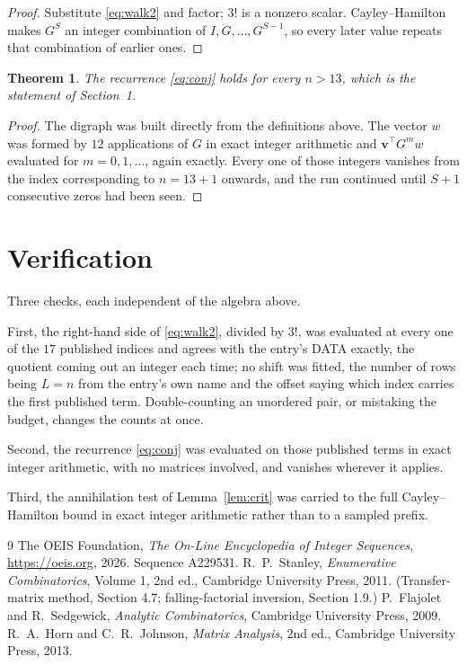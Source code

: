 \documentclass[11pt,a4paper]{article}
\theoremstyle{plain}
\newtheorem{theorem}{Theorem}
\theoremstyle{definition}
\begin{document}
\begin{proof}
Substitute \eqref{eq:walk2} and factor; $3!$ is a nonzero scalar. Cayley--Hamilton
makes $G^{S}$ an integer combination of $I,G,\dots,G^{S-1}$, so every later value repeats
that combination of earlier ones.
\end{proof}

\begin{theorem}
The recurrence \eqref{eq:conj} holds for every $n>13$, which is the statement of
Section~1.
\end{theorem}

\begin{proof}
The digraph was built directly from the definitions above. The vector $w$ was formed by
$12$ applications of $G$ in exact integer arithmetic and $\mathbf{v}^{\!\top}G^{m}w$
evaluated for $m=0,1,\dots$, again exactly. Every one of those integers vanishes from the
index corresponding to $n=13+1$ onwards, and the run continued until $S+1$ consecutive
zeros had been seen.
\end{proof}

\section{Verification}

Three checks, each independent of the algebra above.

First, the right-hand side of \eqref{eq:walk2}, divided by $3!$, was evaluated at every
one of the $17$ published indices and agrees with the entry's DATA exactly, the quotient
coming out an integer each time; no shift was fitted, the number of rows being $L=n$
from the entry's own name and the offset saying which index carries the first published term.
Double-counting an unordered pair, or mistaking the budget, changes the counts at once.

Second, the recurrence \eqref{eq:conj} was evaluated on those published terms in exact
integer arithmetic, with no matrices involved, and vanishes wherever it applies.

Third, the annihilation test of Lemma~\ref{lem:crit} was carried to the full
Cayley--Hamilton bound in exact integer arithmetic rather than to a sampled prefix.

\begin{thebibliography}{9}
 The OEIS Foundation, \emph{The On-Line Encyclopedia of Integer
Sequences}, \url{https://oeis.org}, 2026. Sequence A229531.
 R.~P.~Stanley, \emph{Enumerative Combinatorics}, Volume 1, 2nd ed.,
Cambridge University Press, 2011. (Transfer-matrix method, Section 4.7; falling-factorial
inversion, Section 1.9.)
 P.~Flajolet and R.~Sedgewick, \emph{Analytic Combinatorics}, Cambridge
University Press, 2009.
 R.~A.~Horn and C.~R.~Johnson, \emph{Matrix Analysis}, 2nd ed., Cambridge
University Press, 2013.
\end{thebibliography}
\end{document}
